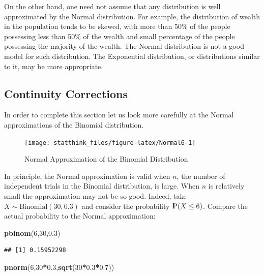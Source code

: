 \documentclass[]{krantz}
\makeatletter
\newenvironment{Shaded}{\begin{snugshade}}{\end{snugshade}}
\newcommand{\DecValTok}[1]{\textcolor[rgb]{0.00,0.00,0.81}{#1}}
\newcommand{\FloatTok}[1]{\textcolor[rgb]{0.00,0.00,0.81}{#1}}
\newcommand{\KeywordTok}[1]{\textcolor[rgb]{0.13,0.29,0.53}{\textbf{#1}}}
\newcommand{\NormalTok}[1]{#1}
\newcommand{\OperatorTok}[1]{\textcolor[rgb]{0.81,0.36,0.00}{\textbf{#1}}}
\newcommand{\Prob}{{\rm I\kern-.3em P}}
\newenvironment{kframe}{%
\medskip{}
\setlength{\fboxsep}{.8em}
 \def\at@end@of@kframe{}%
 \ifinner\ifhmode%
  \def\at@end@of@kframe{\end{minipage}}%
  \begin{minipage}{\columnwidth}%
 \fi\fi%
 \def\FrameCommand##1{\hskip\@totalleftmargin \hskip-\fboxsep
 \colorbox{shadecolor}{##1}\hskip-\fboxsep
     \hskip-\linewidth \hskip-\@totalleftmargin \hskip\columnwidth}%
 \MakeFramed {\advance\hsize-\width
   \@totalleftmargin\z@ \linewidth\hsize
   \@setminipage}}%
 {\par\unskip\endMakeFramed%
 \at@end@of@kframe}
\renewenvironment{Shaded}{\begin{kframe}}{\end{kframe}}
\theoremstyle{definition}
\theoremstyle{definition}
\theoremstyle{definition}
\theoremstyle{remark}
\makeatother
\begin{document}
On the other hand, one need not assume that any distribution is well
approximated by the Normal distribution. For example, the distribution
of wealth in the population tends to be skewed, with more than 50\% of
the people possessing less than 50\% of the wealth and small percentage
of the people possessing the majority of the wealth. The Normal
distribution is not a good model for such distribution. The Exponential
distribution, or distributions similar to it, may be more appropriate.

\hypertarget{continuity-corrections}{%
\subsection{Continuity Corrections}\label{continuity-corrections}}

In order to complete this section let us look more carefully at the
Normal approximations of the Binomial distribution.

\begin{figure}

{\centering \texttt{[image: statthink\_files/figure-latex/Normal6-1]} 

}

\caption{Normal Approximation of the Binomial Distribution}\label{fig:Normal6}
\end{figure}

In principle, the Normal approximation is valid when \(n\), the number of
independent trials in the Binomial distribution, is large. When \(n\) is
relatively small the approximation may not be so good. Indeed, take
\(X \sim \mathrm{Binomial}(30,0.3)\) and consider the probability
\(\Prob(X \leq 6)\). Compare the actual probability to the Normal
approximation:

\begin{Shaded}
\begin{Highlighting}[]
\KeywordTok{pbinom}\NormalTok{(}\DecValTok{6}\NormalTok{,}\DecValTok{30}\NormalTok{,}\FloatTok{0.3}\NormalTok{)}
\end{Highlighting}
\end{Shaded}

\begin{verbatim}
## [1] 0.15952298
\end{verbatim}

\begin{Shaded}
\begin{Highlighting}[]
\KeywordTok{pnorm}\NormalTok{(}\DecValTok{6}\NormalTok{,}\DecValTok{30}\OperatorTok{*}\FloatTok{0.3}\NormalTok{,}\KeywordTok{sqrt}\NormalTok{(}\DecValTok{30}\OperatorTok{*}\FloatTok{0.3}\OperatorTok{*}\FloatTok{0.7}\NormalTok{))}
\end{Highlighting}
\end{Shaded}
\end{document}
